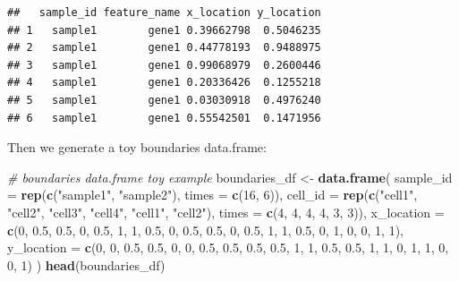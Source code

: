 \documentclass[
]{article}
\newenvironment{Shaded}{\begin{snugshade}}{\end{snugshade}}
\newcommand{\CommentTok}[1]{\textcolor[rgb]{0.56,0.35,0.01}{\textit{#1}}}
\newcommand{\DataTypeTok}[1]{\textcolor[rgb]{0.13,0.29,0.53}{#1}}
\newcommand{\DecValTok}[1]{\textcolor[rgb]{0.00,0.00,0.81}{#1}}
\newcommand{\FloatTok}[1]{\textcolor[rgb]{0.00,0.00,0.81}{#1}}
\newcommand{\KeywordTok}[1]{\textcolor[rgb]{0.13,0.29,0.53}{\textbf{#1}}}
\newcommand{\NormalTok}[1]{#1}
\newcommand{\StringTok}[1]{\textcolor[rgb]{0.31,0.60,0.02}{#1}}
\begin{document}
\begin{verbatim}
##   sample_id feature_name x_location y_location
## 1   sample1        gene1 0.39662798  0.5046235
## 2   sample1        gene1 0.44778193  0.9488975
## 3   sample1        gene1 0.99068979  0.2600446
## 4   sample1        gene1 0.20336426  0.1255218
## 5   sample1        gene1 0.03030918  0.4976240
## 6   sample1        gene1 0.55542501  0.1471956
\end{verbatim}

Then we generate a toy boundaries data.frame:

\begin{Shaded}
\begin{Highlighting}[]
\CommentTok{\# boundaries data.frame toy example}
\NormalTok{boundaries\_df \textless{}{-}}\StringTok{ }\KeywordTok{data.frame}\NormalTok{(}
  \DataTypeTok{sample\_id =} \KeywordTok{rep}\NormalTok{(}\KeywordTok{c}\NormalTok{(}\StringTok{"sample1"}\NormalTok{, }\StringTok{"sample2"}\NormalTok{), }\DataTypeTok{times =} \KeywordTok{c}\NormalTok{(}\DecValTok{16}\NormalTok{, }\DecValTok{6}\NormalTok{)),}
  \DataTypeTok{cell\_id =} \KeywordTok{rep}\NormalTok{(}\KeywordTok{c}\NormalTok{(}\StringTok{"cell1"}\NormalTok{, }\StringTok{"cell2"}\NormalTok{, }\StringTok{"cell3"}\NormalTok{, }\StringTok{"cell4"}\NormalTok{,}
                  \StringTok{"cell1"}\NormalTok{, }\StringTok{"cell2"}\NormalTok{),}
                \DataTypeTok{times =} \KeywordTok{c}\NormalTok{(}\DecValTok{4}\NormalTok{, }\DecValTok{4}\NormalTok{, }\DecValTok{4}\NormalTok{, }\DecValTok{4}\NormalTok{, }\DecValTok{3}\NormalTok{, }\DecValTok{3}\NormalTok{)),}
  \DataTypeTok{x\_location =} \KeywordTok{c}\NormalTok{(}\DecValTok{0}\NormalTok{, }\FloatTok{0.5}\NormalTok{, }\FloatTok{0.5}\NormalTok{, }\DecValTok{0}\NormalTok{,}
                 \FloatTok{0.5}\NormalTok{, }\DecValTok{1}\NormalTok{, }\DecValTok{1}\NormalTok{, }\FloatTok{0.5}\NormalTok{,}
                 \DecValTok{0}\NormalTok{, }\FloatTok{0.5}\NormalTok{, }\FloatTok{0.5}\NormalTok{, }\DecValTok{0}\NormalTok{,}
                 \FloatTok{0.5}\NormalTok{, }\DecValTok{1}\NormalTok{, }\DecValTok{1}\NormalTok{, }\FloatTok{0.5}\NormalTok{,}
                 \DecValTok{0}\NormalTok{, }\DecValTok{1}\NormalTok{, }\DecValTok{0}\NormalTok{,}
                 \DecValTok{0}\NormalTok{, }\DecValTok{1}\NormalTok{, }\DecValTok{1}\NormalTok{),}
  \DataTypeTok{y\_location =} \KeywordTok{c}\NormalTok{(}\DecValTok{0}\NormalTok{, }\DecValTok{0}\NormalTok{, }\FloatTok{0.5}\NormalTok{, }\FloatTok{0.5}\NormalTok{,}
                 \DecValTok{0}\NormalTok{, }\DecValTok{0}\NormalTok{, }\FloatTok{0.5}\NormalTok{, }\FloatTok{0.5}\NormalTok{,}
                 \FloatTok{0.5}\NormalTok{, }\FloatTok{0.5}\NormalTok{, }\DecValTok{1}\NormalTok{, }\DecValTok{1}\NormalTok{,}
                 \FloatTok{0.5}\NormalTok{, }\FloatTok{0.5}\NormalTok{, }\DecValTok{1}\NormalTok{, }\DecValTok{1}\NormalTok{,}
                 \DecValTok{0}\NormalTok{, }\DecValTok{1}\NormalTok{, }\DecValTok{1}\NormalTok{,}
                 \DecValTok{0}\NormalTok{, }\DecValTok{0}\NormalTok{, }\DecValTok{1}\NormalTok{)}
\NormalTok{)}
\KeywordTok{head}\NormalTok{(boundaries\_df)}
\end{Highlighting}
\end{Shaded}
\end{document}
